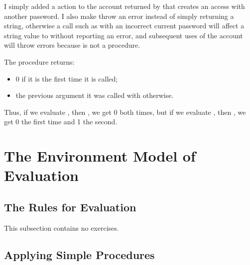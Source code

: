 \begin{exe}[3.7]
    I simply added a  action to the account returned by 
     that creates an access with another password. I also 
    make  throw an error instead of simply returning 
    a string, otherwise a call such as
     with an 
    incorrect current password will affect a string value to  
    without reporting an error, and subsequent uses of the account will throw 
    errors because  is not a procedure.
\end{exe}

\begin{exe}[3.8]
    The procedure  returns:
    \begin{itemize}
        \item 0 if it is the first time it is called;
        \item the previous argument it was called with otherwise.
    \end{itemize}
    Thus, if we evaluate , then , we get 0 both times, 
    but if we evaluate , then , we get 0 the first 
    time and 1 the second.
\end{exe}

\section{The Environment Model of Evaluation}

\subsection{The Rules for Evaluation}

This subsection contains no exercises.

\subsection{Applying Simple Procedures}


